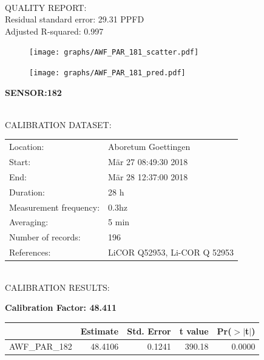 \documentclass[oneside]{report}
\begin{document}
\hrulefill\\
QUALITY REPORT:\\
Residual standard error: 29.31 PPFD\\
Adjusted R-squared: 0.997



\begin{figure}[H]
  \centering
  \texttt{[image: graphs/AWF\_PAR\_181\_scatter.pdf]}
\end{figure}




\begin{figure}[H]
  \centering
  \texttt{[image: graphs/AWF\_PAR\_181\_pred.pdf]}
\end{figure}

\pagebreak


\begin{center}
\large{\textbf{SENSOR:182}}\\
\end{center}

\hrulefill\\
CALIBRATION DATASET:\\
\begin{table}[h!]
  \centering
  \label{tab:table1}
  \begin{tabular}{ll}
    Location: & Aboretum Goettingen\\ 
    
    
    Start:  & Mär 27 08:49:30 2018 \\
    End:   & Mär 28 12:37:00 2018\\ 
    Duration: & 28 h\\
    Measurement frequency: & 0.3hz\\
    Averaging:  &5 min\\
    Number of records: & 196 \\
    References: & LiCOR Q52953, Li-COR Q 52953 \\
  \end{tabular}
\end{table}

\hrulefill\\
CALIBRATION RESULTS:\\


\begin{center}
\textbf{\large{Calibration Factor: 48.411}}\\
\end{center}
\begin{table}[ht]
\centering
\begin{tabular}{rrrrr}
  \hline
 & Estimate & Std. Error & t value & Pr($>$$|$t$|$) \\ 
  \hline
AWF\_PAR\_182 & 48.4106 & 0.1241 & 390.18 & 0.0000 \\ 
   \hline
\end{tabular}
\end{table}
\end{document}
